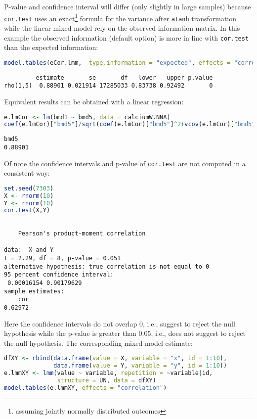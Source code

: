 \documentclass[12pt]{article}
\begin{document}
P-value and confidence interval will differ (only slightly in large
samples) because \texttt{cor.test} uses an exact\footnote{assuming jointly
normally distributed outcomes} formula for the variance after \texttt{atanh}
transformation while the linear mixed model rely on the observed
information matrix. In this example the observed information (default
option) is more in line with \texttt{cor.test} than the expected information:
\begin{lstlisting}[language=r,numbers=none]
model.tables(eCor.lmm,  type.information = "expected", effects = "correlation")["rho(1,5)",]
\end{lstlisting}

\label{}
\begin{verbatim}
         estimate       se       df   lower   upper p.value
rho(1,5)  0.88901 0.021914 17285033 0.83738 0.92492       0
\end{verbatim}


\bigskip

Equivalent results can be obtained with a linear regression:
\begin{lstlisting}[language=r,numbers=none]
e.lmCor <- lm(bmd1 ~ bmd5, data = calciumW.NNA)
coef(e.lmCor)["bmd5"]/sqrt(coef(e.lmCor)["bmd5"]^2+vcov(e.lmCor)["bmd5","bmd5"]*df.residual(e.lmCor))
\end{lstlisting}

\label{}
\begin{verbatim}
bmd5 
0.88901
\end{verbatim}


\clearpage

Of note the confidence intervals and p-value of \texttt{cor.test} are not
computed in a consistent way: 
\begin{lstlisting}[language=r,numbers=none]
set.seed(7303)
X <- rnorm(10)
Y <- rnorm(10)
cor.test(X,Y)
\end{lstlisting}

\label{}
\begin{verbatim}

	Pearson's product-moment correlation

data:  X and Y
t = 2.29, df = 8, p-value = 0.051
alternative hypothesis: true correlation is not equal to 0
95 percent confidence interval:
 0.00016154 0.90179629
sample estimates:
    cor 
0.62972
\end{verbatim}

\noindent Here the confidence intervals do not overlap 0, i.e.,
suggest to reject the null hypothesis while the p-value is greater
than 0.05, i.e., does not suggest to reject the null hypothesis. The
corresponding mixed model estimate:
\begin{lstlisting}[language=r,numbers=none]
dfXY <- rbind(data.frame(value = X, variable = "x", id = 1:10),
              data.frame(value = Y, variable = "y", id = 1:10))
e.lmmXY <- lmm(value ~ variable, repetition = ~variable|id,
               structure = UN, data = dfXY)
model.tables(e.lmmXY, effects = "correlation")
\end{lstlisting}
\end{document}
